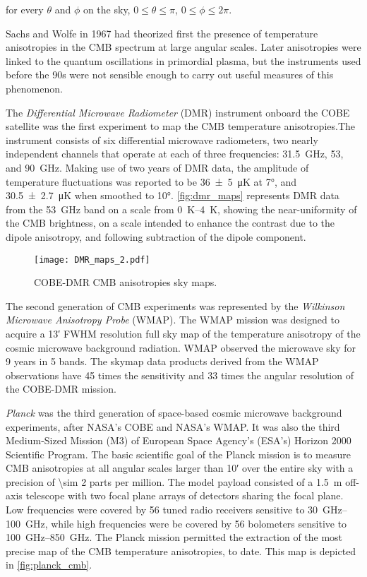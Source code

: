 for every $\theta$ and $\phi$ on the sky, $0 \leq \theta \leq \pi$,
$0 \leq \phi \leq 2\pi$.

Sachs and Wolfe in 1967 had theorized first the presence of temperature
anisotropies in the CMB spectrum at large angular scales. Later
anisotropies were linked to the quantum oscillations in primordial plasma,
but the instruments used before the 90s were not sensible enough to carry
out useful measures of this phenomenon.

The \emph{Differential Microwave Radiometer} (DMR) instrument onboard the
COBE satellite was the first experiment to map the CMB temperature
anisotropies.The instrument consists of six differential microwave
radiometers, two nearly independent channels that operate at each of three
frequencies: \SI{ 31.5}{\giga\hertz}, \num{53}, and \SI{90}{\giga\hertz}.
Making use of two years of DMR data, the amplitude of temperature fluctuations
was reported to be
\SI{36 \pm 5}{\micro\kelvin} at \ang{7}, and
\SI{30.5 \pm 2.7}{\micro\kelvin} when smoothed to \ang{10}.
\autoref{fig:dmr_maps} represents DMR data from the \SI{53}{\giga\hertz}
band on a scale from \SIrange{0}{4}{\kelvin}, showing the near-uniformity of the
CMB brightness, on a scale intended to enhance the contrast due to
the dipole anisotropy, and following subtraction of the dipole component.

\begin{figure}
        \centering
        \texttt{[image: DMR\_maps\_2.pdf]}
        \caption{COBE-DMR CMB anisotropies sky maps.}
        \label{fig:dmr_maps}
\end{figure}

The second generation of CMB experiments was represented by the
\emph{Wilkinson Microwave Anisotropy Probe} (WMAP). The WMAP mission was
designed to acquire a \ang{;13;} FWHM resolution full sky
map of the temperature anisotropy of the cosmic microwave background
radiation. WMAP observed the microwave sky for \num{9} years in \num{5}
bands. The skymap data products derived from the WMAP observations have
\num{45} times the sensitivity and \num{33} times the angular resolution
of the COBE-DMR mission.

\emph{Planck} was the third generation of space-based cosmic microwave background
experiments, after NASA's COBE and NASA's WMAP. It was also the third
Medium-Sized Mission (M3) of European Space Agency's (ESA's) Horizon 2000
Scientific Program. The basic scientific goal of the Planck mission is to
measure CMB anisotropies at all angular scales larger than \ang{;10;}
over the entire sky with a precision of \num{\sim 2} parts per million.
The model payload consisted of a \SI{1.5}{\meter} off-axis telescope with
two focal plane arrays of detectors sharing the focal plane. Low frequencies
were covered by \num{56} tuned radio receivers sensitive to
\SIrange{30}{100}{\giga\hertz}, while high frequencies were be covered by
\num{56} bolometers sensitive to \SIrange{100}{850}{\giga\hertz}.
The Planck mission permitted the extraction of the most precise map of the
CMB temperature anisotropies, to date. This map is depicted in
\autoref{fig:planck_cmb}.

